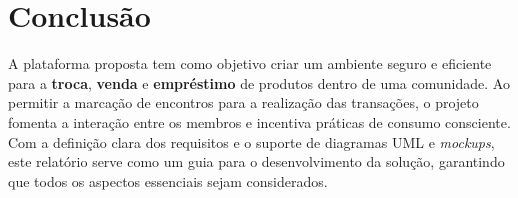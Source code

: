 \documentclass[a4paper, 12pt]{article} %
\begin{document}
\newpage
\section{Conclusão}

A plataforma proposta tem como objetivo criar um ambiente seguro e eficiente para a \textbf{troca}, \textbf{venda} e \textbf{empréstimo} de produtos dentro de uma comunidade. Ao permitir a marcação de encontros para a realização das transações, o projeto fomenta a interação entre os membros e incentiva práticas de consumo consciente. 
Com a definição clara dos requisitos e o suporte de diagramas UML e \textit{mockups}, este relatório serve como um guia para o desenvolvimento da solução, garantindo que todos os aspectos essenciais sejam considerados.

\newpage
\nocite{*}

\printbibliography
\end{document}
